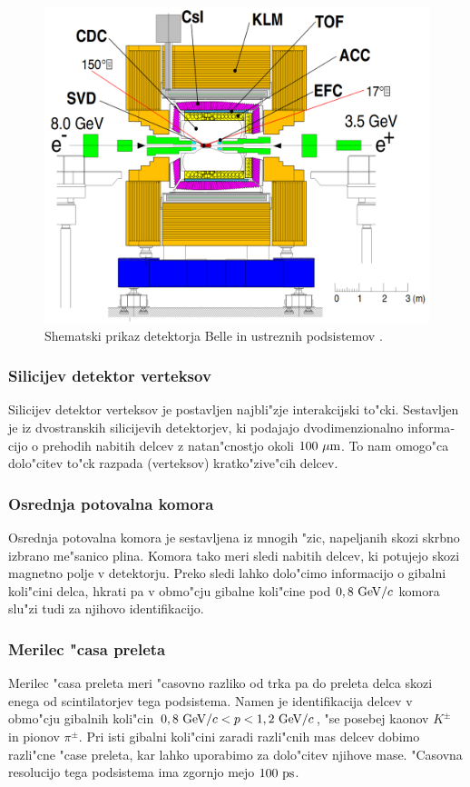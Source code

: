 \begin{otherlanguage}{slovene}
\begin{figure}[H]
	\centering
	\captionsetup{width=0.8\linewidth}
	\includegraphics[width=0.8\linewidth]{fig/setup/Belle_detector}
	\caption{Shematski prikaz detektorja Belle in ustreznih podsistemov \cite{ABASHIAN2002117}.}
	\label{fig:bdet_si}
\end{figure}

\subsubsection{Silicijev  detektor verteksov}
Silicijev detektor verteksov je postavljen najbli"zje interakcijski to"cki. Sestavljen je iz dvostranskih silicijevih detektorjev, ki podajajo dvodimenzionalno informacijo o prehodih nabitih delcev z natan"cnostjo okoli $100\mathrm{~\mu m}$. To nam omogo"ca dolo"citev to"ck razpada (verteksov) kratko"zive"cih delcev.

\subsubsection{Osrednja potovalna komora}
Osrednja potovalna komora je sestavljena iz mnogih "zic, napeljanih skozi skrbno izbrano me"sanico plina. Komora tako meri sledi nabitih delcev, ki potujejo skozi magnetno polje v detektorju. Preko sledi lahko dolo"cimo informacijo o gibalni koli"cini delca, hkrati pa v obmo"cju gibalne koli"cine pod $0,8\mathrm{~GeV}/c$ komora slu"zi tudi za njihovo identifikacijo.

\subsubsection{Merilec "casa preleta}
Merilec "casa preleta meri "casovno razliko od trka pa do preleta delca skozi enega od scintilatorjev tega podsistema. Namen je identifikacija delcev v obmo"cju gibalnih koli"cin $0,8\mathrm{~GeV}/c < p < 1,2\mathrm{~GeV}/c$, "se posebej kaonov $K^\pm$ in pionov $\pi^\pm$. Pri isti gibalni koli"cini zaradi razli"cnih mas delcev dobimo razli"cne "case preleta, kar lahko uporabimo za dolo"citev njihove mase. "Casovna resolucijo tega podsistema ima zgornjo mejo $100\mathrm{~ps}$.


\end{otherlanguage}

